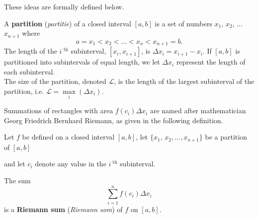 These ideas are formally defined below.

\begin{definition}[Partition]\label{def:partition}
A \textbf{partition} (\textit{partitie}) of a closed interval $[a,b]$ is a set of numbers $x_1$, $x_2$, $\ldots$ $x_{n+1}$ where 
$$a=x_1 < x_2 < \ldots < x_n < x_{n+1}=b.$$
The length of the $i^\text{ th}$ subinterval, $[x_i,x_{i+1}]$, is $\Delta x_i = x_{i+1}-x_i$. If $[a,b]$ is partitioned into subintervals of equal length, we let $\Delta x_i$ represent the length of each subinterval.\\

The size of the partition, denoted $\mathcal{L}$, is the length of the largest subinterval of the partition, i.e. $\mathcal{L}=\max\limits_i\left(\Delta x_i\right)$.
\end{definition}

Summations of rectangles with area $f(c_i)\Delta x_i$ are named after mathematician Georg Friedrich Bernhard Riemann, as given in the following definition.

\begin{definition}\label{def:rie_sum}
Let $f$ be defined on a closed interval $[a,b]$, let $\{x_1,\,x_2,\ldots,x_{n+1}\}$ be a partition of $[a,b]$ 

and let $c_i$ denote any value in the $i^\text{ th}$ subinterval.

The sum $$\sum_{i=1}^n f(c_i)\Delta x_i$$  is a \textbf{Riemann sum} (\textit{Riemann som}) of $f$ on $[a,b]$.
\end{definition}



